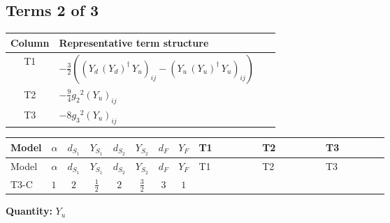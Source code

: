 \documentclass[8pt]{article}
\begin{document}
\begin{landscape}
\subsection*{Terms 2 of 3}
\begin{center}
\begin{tabular}{@{}c >{\raggedright\arraybackslash}p{0.82\linewidth}@{}}
\toprule
Column & Representative term structure \\
\midrule
T1 & \(\displaystyle -\frac{3}{2} (\left({Y_d}\,\left({Y_d}\right)^{\dagger}\,{Y_u}\right)_{ij}-\left({Y_u}\,\left({Y_u}\right)^{\dagger}\,{Y_u}\right)_{ij})\) \\
\midrule
T2 & \(\displaystyle -\frac{9}{4} {g_2}^2 \left({Y_u}\right)_{ij}\) \\
\midrule
T3 & \(\displaystyle -8 {g_3}^2 \left({Y_u}\right)_{ij}\) \\
\midrule
\bottomrule
\end{tabular}
\end{center}
\smallskip
\tiny
\begin{longtable}{@{}llcccccc >{\raggedright\arraybackslash}p{0.21\linewidth} >{\raggedright\arraybackslash}p{0.21\linewidth} >{\raggedright\arraybackslash}p{0.21\linewidth}@{}}
\toprule
Model & $\alpha$ & $d_{S_1}$ & $Y_{S_1}$ & $d_{S_2}$ & $Y_{S_2}$ & $d_F$ & $Y_F$ & T1 & T2 & T3 \\
\midrule
\endfirsthead
\toprule
Model & $\alpha$ & $d_{S_1}$ & $Y_{S_1}$ & $d_{S_2}$ & $Y_{S_2}$ & $d_F$ & $Y_F$ & T1 & T2 & T3 \\
\midrule
\endhead
T3-C & $1$ & $2$ & $\frac{1}{2}$ & $2$ & $\frac{3}{2}$ & $3$ & $1$ & \scriptsize\adjustbox{max width=\linewidth}{$\begin{gathered} -\frac{3}{2} (\left({Y_d}\,\left({Y_d}\right)^{\dagger}\,{Y_u}\right)_{ij}-\left({Y_u}\,\left({Y_u}\right)^{\dagger}\,{Y_u}\right)_{ij})\end{gathered}$} & \scriptsize\adjustbox{max width=\linewidth}{$\begin{gathered} -\frac{9}{4} {g_2}^2 \left({Y_u}\right)_{ij}\end{gathered}$} & \scriptsize\adjustbox{max width=\linewidth}{$\begin{gathered} -8 {g_3}^2 \left({Y_u}\right)_{ij}\end{gathered}$} \\
\midrule
\bottomrule
\end{longtable}
\clearpage
\noindent\textbf{Quantity: }$Y_u$\par\smallskip

\end{landscape}
\end{document}
